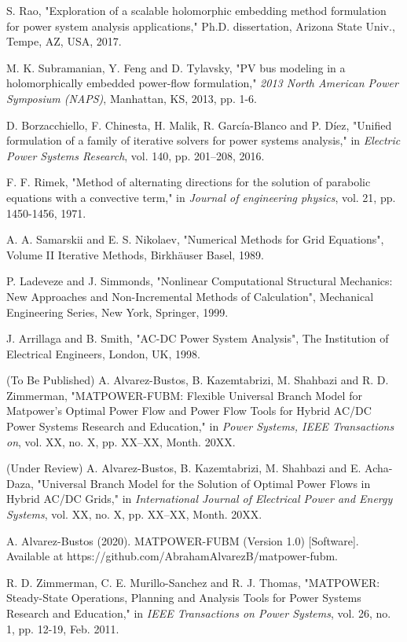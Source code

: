 \documentclass[journal]{IEEEtran}
\begin{document}
\begin{thebibliography}{31}
S. Rao, "Exploration of a scalable holomorphic embedding method formulation for power system analysis applications," Ph.D. dissertation, Arizona State Univ., Tempe, AZ, USA, 2017.

M. K. Subramanian, Y. Feng and D. Tylavsky, "PV bus modeling in a holomorphically embedded power-flow formulation," \emph{2013 North American Power Symposium (NAPS)}, Manhattan, KS, 2013, pp. 1-6.

D. Borzacchiello, F. Chinesta, H. Malik, R. García-Blanco and P. Díez, "Unified formulation of a family of iterative solvers for power systems analysis," in \emph{Electric Power Systems Research}, vol. 140, pp. 201–208, 2016.

F. F. Rimek, "Method of alternating directions for the solution of parabolic equations with a convective term," in \emph{Journal of engineering physics}, vol. 21, pp. 1450-1456, 1971.

A. A. Samarskii and E. S. Nikolaev, "Numerical Methods for Grid Equations", Volume II Iterative Methods, Birkhäuser Basel, 1989.

P. Ladeveze and J. Simmonds, "Nonlinear Computational Structural Mechanics: New Approaches and Non-Incremental Methods of Calculation", Mechanical Engineering Series, New York, Springer, 1999.

J. Arrillaga and B. Smith, "AC-DC Power System Analysis", The Institution of Electrical Engineers, London, UK, 1998.

(To Be Published) A. Alvarez-Bustos, B. Kazemtabrizi, M. Shahbazi and R. D. Zimmerman, "MATPOWER-FUBM: Flexible Universal Branch Model for Matpower’s Optimal Power Flow and Power Flow Tools for Hybrid AC/DC Power Systems Research and Education," in \emph{Power Systems, IEEE Transactions on}, vol. XX, no. X, pp. XX–XX, Month. 20XX.  

(Under Review) A. Alvarez-Bustos, B. Kazemtabrizi, M. Shahbazi and E. Acha-Daza, "Universal Branch Model for the Solution of Optimal Power Flows in Hybrid AC/DC Grids," in \emph{International Journal of Electrical Power and Energy Systems}, vol. XX, no. X, pp. XX–XX, Month. 20XX. 

A. Alvarez-Bustos (2020). MATPOWER-FUBM (Version 1.0) [Software]. Available at https://github.com/AbrahamAlvarezB/matpower-fubm.

R. D. Zimmerman, C. E. Murillo-Sanchez and R. J. Thomas, "MATPOWER: Steady-State Operations, Planning and Analysis Tools for Power Systems Research and Education," in \emph{IEEE Transactions on Power Systems}, vol. 26, no. 1, pp. 12-19, Feb. 2011.


\end{thebibliography}
\end{document}
